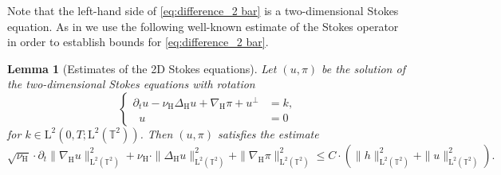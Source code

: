 \documentclass[preprint]{elsarticle}
\newtheorem{lem}[lem]{Lemma}
\numberwithin{equation}{section}
\newcommand {\T}	{\mathbb{T}}
\DeclareMathOperator{\divH}{div_{\H}}
\renewcommand{\H}{\mathrm{H}}
\newcommand{\nablaH}{\nabla_{\H}}
\newcommand{\DeltaH}{\Delta_{\H}}
\newcommand{\rL}{\mathrm{L}}
\newcommand{\rH}{\H}
\begin{document}
Note that the left-hand side of \eqref{eq:difference_2 bar} is a two-dimensional Stokes equation. As in \cite[Lemma 6.1]{HK:16_2} we use the following well-known estimate of the Stokes operator in order to establish bounds for \eqref{eq:difference_2 bar}.

\begin{lem}[Estimates of the 2D Stokes equations]\label{lem:2D NSE_2}
	Let $(u,\pi)$ be the solution of the two-dimensional Stokes equations with rotation
	\begin{equation*} 
		\left\{
		\begin{aligned}
			\partial_t u - \nu_{\rH} \DeltaH u + \nablaH \pi + u^\perp &= k,\\
			\divH u &= 0
		\end{aligned}
		\right. 
	\end{equation*} 
	for $k \in \rL^2(0,T;\rL^2(\T^2))$. Then $(u,\pi)$ satisfies the estimate 
	\begin{equation*}
		\sqrt{\nu_{\rH}} \cdot \partial_t \| \nablaH u \|_{\rL^2(\T^2)}^2
		+ \nu_{\rH} \cdot \| \DeltaH u \|_{\rL^2(\T^2)}^2
		+ \| \nablaH \pi \|_{\rL^2(\T^2)}^2
		\leq C \cdot (\| h \|_{\rL^2(\T^2)}^2+\| u \|_{\rL^2(\T^2)}^2) .
	\end{equation*}
\end{lem}
\end{document}
